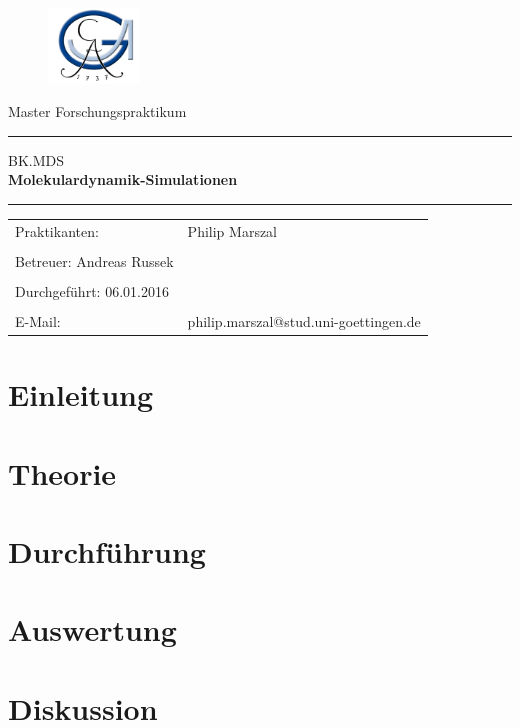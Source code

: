 \documentclass[a4paper, 12pt]{article}
\begin{document}
 \begin{titlepage}
 \begin{figure}[t]
 \includegraphics[height=2cm]{georg} \hfill
 \end{figure}

\normalsize
\vspace{1cm}

\begin{center}
\Large Master Forschungspraktikum \\ \vspace{1cm}
\hrule \vspace{3mm}
\large {BK.MDS} \\
\Huge{\bf Molekulardynamik-Simulationen}
\vspace{5mm}
\hrule
\end{center}

\normalsize

\begin{table}[!h]
\begin{center}

  \begin{tabular}{ll}
  Praktikanten: &Philip Marszal\\
   &\\
  Betreuer: Andreas Russek& \\
  &\\
  Durchgeführt: 06.01.2016&\\

\vspace{1cm}& \\
  E-Mail: & \ttfamily philip.marszal@stud.uni-goettingen.de\\
\end{tabular}
\end{center}
\end{table}
\vspace{2cm}


\end{titlepage}

\thispagestyle{empty}
\newpage
\thispagestyle{empty}
\mbox{}
\newpage
\thispagestyle{empty}
\tableofcontents
\newpage

\pagestyle{fancy}
\setcounter{page}{1}

\section{Einleitung}

\section{Theorie}

\FloatBarrier

\FloatBarrier
\section{Durchführung}

\FloatBarrier
\section{Auswertung}

\FloatBarrier
\section{Diskussion}

\newpage

\end{document}

